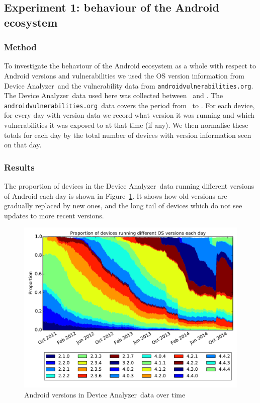 \documentclass[conference,a4paper,twoside]{IEEEtran}
\newcommand{\da}{Device Analyzer}
\newcommand{\avo}{\texttt{androidvulnerabilities.org}}
\begin{document}

\subsection{Experiment 1: behaviour of the Android ecosystem}\label{sec:exp:android_ecosystem}

\subsubsection{Method}
To investigate the behaviour of the Android ecosystem as a whole with respect to Android versions and vulnerabilities we used the OS version information from \da\ and the vulnerability data from \avo.
The \da\ data used here was collected between \daStartDate\ and \daEndDate.
The \avo\ data covers the period from \avoFirstDataDate\ to \avoLastDataDate.
For each device, for every day with version data we record what version it was running and which vulnerabilities it was exposed to at that time (if any).
We then normalise these totals for each day by the total number of devices with version information seen on that day.

\subsubsection{Results}
The proportion of devices in the \da\ data running different versions of Android each day is shown in Figure~\ref{fig:norm_os}.
It shows how old versions are gradually replaced by new ones, and the long tail of devices which do not see updates to more recent versions.

\begin{figure}
 \centering
 \includegraphics[width=\columnwidth]{figures/da_norm_os}
 \caption{Android versions in \da\ data over time}
 \label{fig:norm_os}
\end{figure}
\end{document}
